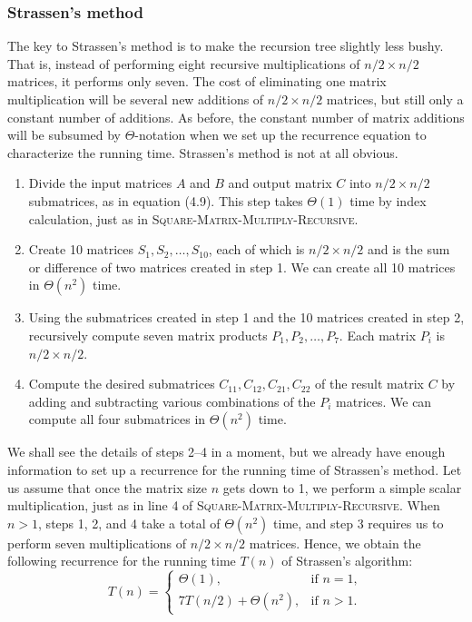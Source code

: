 \documentclass{report}
\begin{document}
        \subsubsection{Strassen’s method}
        \bigbreak \noindent 
        The key to Strassen’s method is to make the recursion tree slightly less bushy. That is, instead of performing eight recursive multiplications of \(n/2 \times n/2\) matrices, it performs only seven. The cost of eliminating one matrix multiplication will be several new additions of \(n/2 \times n/2\) matrices, but still only a constant number of additions. As before, the constant number of matrix additions will be subsumed by \(\Theta\)-notation when we set up the recurrence equation to characterize the running time.
        \bigbreak \noindent 
        Strassen’s method is not at all obvious. 
        \bigbreak \noindent 
        \begin{enumerate}
            \item Divide the input matrices \(A\) and \(B\) and output matrix \(C\) into \(n/2 \times n/2\) submatrices, as in equation (4.9). This step takes \(\Theta(1)\) time by index calculation, just as in \textsc{Square-Matrix-Multiply-Recursive}.
            \item Create 10 matrices \(S_1, S_2, \dots, S_{10}\), each of which is \(n/2 \times n/2\) and is the sum or difference of two matrices created in step 1. We can create all 10 matrices in \(\Theta(n^2)\) time.
            \item Using the submatrices created in step 1 and the 10 matrices created in step 2, recursively compute seven matrix products \(P_1, P_2, \dots, P_7\). Each matrix \(P_i\) is \(n/2 \times n/2\).
            \item Compute the desired submatrices \(C_{11}, C_{12}, C_{21}, C_{22}\) of the result matrix \(C\) by adding and subtracting various combinations of the \(P_i\) matrices. We can compute all four submatrices in \(\Theta(n^2)\) time.
        \end{enumerate}
        We shall see the details of steps 2--4 in a moment, but we already have enough information to set up a recurrence for the running time of Strassen’s method. Let us assume that once the matrix size \(n\) gets down to 1, we perform a simple scalar multiplication, just as in line 4 of \textsc{Square-Matrix-Multiply-Recursive}. When \(n > 1\), steps 1, 2, and 4 take a total of \(\Theta(n^2)\) time, and step 3 requires us to perform seven multiplications of \(n/2 \times n/2\) matrices. Hence, we obtain the following recurrence for the running time \(T(n)\) of Strassen’s algorithm:
        \[
            T(n) = 
            \begin{cases} 
                \Theta(1), & \text{if } n = 1, \\
                7T(n/2) + \Theta(n^2), & \text{if } n > 1.
            \end{cases}
        \]
\end{document}
